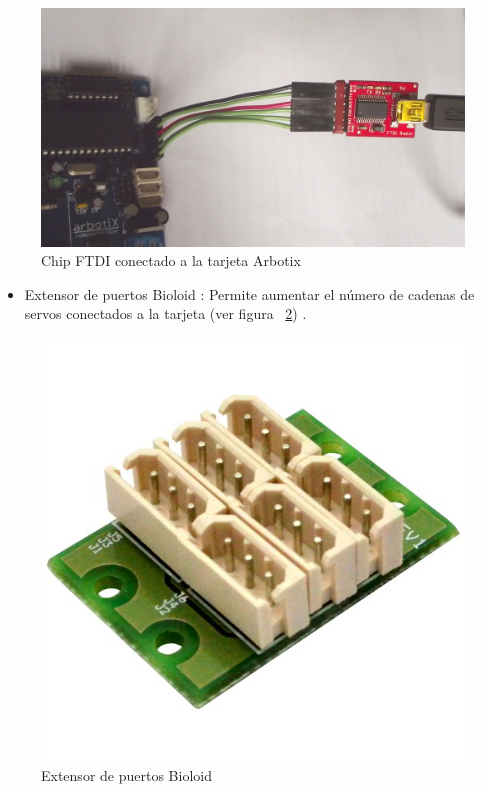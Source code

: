 \begin{figure}[hbtp]
\centering
\includegraphics[scale=0.06]{imagenes/DSCF1162.jpg}
\caption{Chip FTDI conectado a la tarjeta Arbotix}
\label{fig:ftdi}
\end{figure}

\begin{itemize}
\item Extensor de puertos Bioloid : Permite aumentar el número de cadenas de servos conectados a la tarjeta (ver figura ~\ref{fig:ext}) \cite{hub}.
\end{itemize}

\begin{figure}[hbtp]
\centering
\includegraphics[scale=0.15]{imagenes/Dynamixel-AX-MX-6-Port-Extension-Hub-600x600.jpg}
\caption{Extensor de puertos Bioloid}
\label{fig:ext}
\end{figure}

